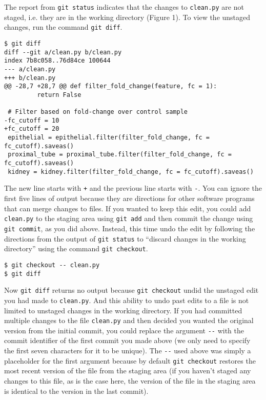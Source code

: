 The report from \verb|git status| indicates that the changes to \verb|clean.py| are not staged, i.e. they are in the working directory (Figure 1).
To view the unstaged changes, run the command \verb|git diff|.

\begin{verbatim}
$ git diff
diff --git a/clean.py b/clean.py
index 7b8c058..76d84ce 100644
--- a/clean.py
+++ b/clean.py
@@ -28,7 +28,7 @@ def filter_fold_change(feature, fc = 1):
         return False

 # Filter based on fold-change over control sample
-fc_cutoff = 10
+fc_cutoff = 20
 epithelial = epithelial.filter(filter_fold_change, fc = fc_cutoff).saveas()
 proximal_tube = proximal_tube.filter(filter_fold_change, fc = fc_cutoff).saveas()
 kidney = kidney.filter(filter_fold_change, fc = fc_cutoff).saveas()
\end{verbatim}

The new line starts with \verb|+| and the previous line starts with \verb|-|.
You can ignore the first five lines of output because they are directions for other software programs that can merge changes to files.
If you wanted to keep this edit, you could add \verb|clean.py| to the staging area using \verb|git add| and then commit the change using \verb|git commit|, as you did above.
Instead, this time undo the edit by following the directions from the output of \verb|git status| to ``discard changes in the working directory'' using the command \verb|git checkout|.

\begin{verbatim}
$ git checkout -- clean.py
$ git diff
\end{verbatim}

Now \verb|git diff| returns no output because \verb|git checkout| undid the unstaged edit you had made to \verb|clean.py|.
And this ability to undo past edits to a file is not limited to unstaged changes in the working directory.
If you had committed multiple changes to the file \verb|clean.py| and then decided you wanted the original version from the initial commit, you could replace the argument \verb|--| with the commit identifier of the first commit you made above (we only need to specify the first seven characters for it to be unique).
The \verb|--| used above was simply a placeholder for the first argument because by default \verb|git checkout| restores the most recent version of the file from the staging area (if you haven't staged any changes to this file, as is the case here, the version of the file in the staging area is identical to the version in the last commit).

